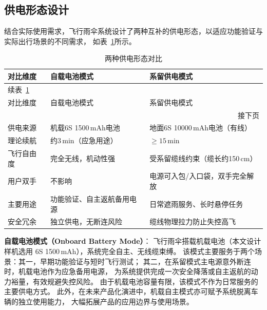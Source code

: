 \subsection{供电形态设计}

结合实际使用需求，飞行雨伞系统设计了两种互补的供电形态，以适应功能验证与实际出行场景的不同需求，
如表~\ref{tab:power_mode}所示。

\begin{longtable}{lll}
    \caption{两种供电形态对比}
    \label{tab:power_mode} \\

    \toprule
    对比维度 & 自载电池模式 & 系留供电模式 \\
    \midrule
    \endfirsthead

    \multicolumn{3}{l}{\small 续表~\ref*{tab:power_mode}} \\[2pt]
    \toprule
    对比维度 & 自载电池模式 & 系留供电模式 \\
    \midrule
    \endhead

    \midrule
    \multicolumn{3}{r}{\small 接下页} \\
    \endfoot

    \bottomrule
    \endlastfoot

    供电来源   & 机载6S 1500\,mAh电池          & 地面6S 10000\,mAh电池（有线） \\[3pt]
    理论续航   & 约3\,min（应急用途）           & $\geq15$\,min \\[3pt]
    飞行自由度 & 完全无线，机动性强              & 受系留缆线约束（缆长约150\,cm） \\[3pt]
    用户双手   & 不影响                         & 电源可入包/入口袋，双手完全解放 \\[3pt]
    主要用途   & 功能验证、自主返航备用电源      & 日常遮雨服务、长时悬停任务 \\[3pt]
    安全冗余   & 独立供电，无断连风险            & 缆线物理拉力防止失控高飞 \\

\end{longtable}

\textbf{自载电池模式（Onboard Battery Mode）}：
飞行雨伞搭载机载电池（本文设计样机选用 6S 1500\,mAh），系统完全自主、无线缆束缚。
该模式主要服务于两个场景：其一，早期功能验证与短时飞行测试；
其二，在系留模式主电源意外断连时，机载电池作为应急备用电源，
为系统提供完成一次安全降落或自主返航的动力裕量，有效规避失控风险。
由于机载电池容量有限，该模式不作为日常服务的主要供电方式。
此外，在未来产品化演进中，机载自主模式亦可赋予系统脱离车辆的独立使用能力，
大幅拓展产品的应用边界与使用场景。

